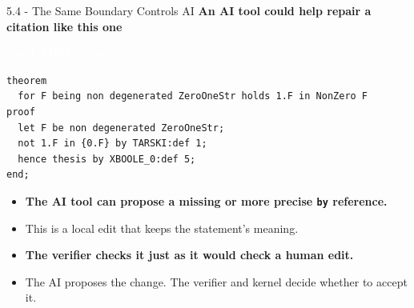 \documentclass[aspectratio=169,11pt]{beamer}
\newcommand{\statusbadge}[2]{\colorbox{#1}{\textcolor{white}{\strut\scriptsize\sffamily\bfseries #2}}}
\newcommand{\badgeMML}{\statusbadge{blue!45!black}{exact MML excerpt}}
\begin{document}
\begin{frame}[fragile,t]{5.4 - The Same Boundary Controls AI}
\smallskip
\textbf{An AI tool could help repair a citation like this one}~\badgeMML
\begin{lstlisting}[language={mizar},basicstyle=\ttfamily\small]
theorem
  for F being non degenerated ZeroOneStr holds 1.F in NonZero F
proof
  let F be non degenerated ZeroOneStr;
  not 1.F in {0.F} by TARSKI:def 1;
  hence thesis by XBOOLE_0:def 5;
end;
\end{lstlisting}
\begin{itemize}
\setlength{\itemsep}{1pt}
\setlength{\parsep}{0pt}
\setlength{\parskip}{0pt}
\item \textcolor{blue!55!black}{\textbf{The AI tool can propose a missing or more precise \texttt{by} reference.}}
\item This is a local edit that keeps the statement's meaning.
\item \textcolor{blue!55!black}{\textbf{The verifier checks it just as it would check a human edit.}}
\item The AI proposes the change. The verifier and kernel decide whether to accept it.
\end{itemize}
\end{frame}
\end{document}
